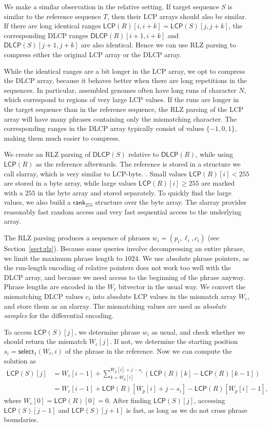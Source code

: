 \documentclass[a4paper,11pt]{llncs}
\newcommand{\set}[1]{\ensuremath{\{ #1 \}}}
\newcommand{\LCP}{\textsf{LCP}}
\newcommand{\DLCP}{\textsf{DLCP}}
\newcommand{\LCPbyte}{\textsf{LCP\nobreakdash-byte}}
\newcommand{\mLCP}{\ensuremath{\mathsf{LCP}}}
\newcommand{\mDLCP}{\ensuremath{\mathsf{DLCP}}}
\newcommand{\RLZ}{\textsf{RLZ}}
\newcommand{\slarray}{\textsf{slarray}}
\newcommand{\mrank}{\ensuremath{\mathsf{rank}}}
\newcommand{\mselect}{\ensuremath{\mathsf{select}}}
\begin{document}
We make a similar observation in the relative setting. If target sequence $S$
is similar to the reference sequence $T$, then their \LCP{} arrays should also
be similar. If there are long identical ranges $\mLCP(R)[i,i+k] =
\mLCP(S)[j,j+k]$, the corresponding \DLCP{} ranges $\mDLCP(R)[i+1,i+k]$ and
$\mDLCP(S)[j+1,j+k]$ are also identical. Hence we can use \RLZ{} parsing to
compress either the original \LCP{} array or the \DLCP{} array.

While the identical ranges are a bit longer in the \LCP{} array, we opt to
compress the \DLCP{} array, because it behaves better when there are long
repetitions in the sequences. In particular, assembled genomes often have long
runs of character $N$, which correspond to regions of very large \LCP{}
values. If the runs are longer in the target sequence than in the reference
sequence, the \RLZ{} parsing of the \LCP{} array will have many phrases
containing only the mismatching character. The corresponding ranges in the
\DLCP{} array typically consist of values $\set{-1, 0, 1}$, making them much
easier to compress.

We create an \RLZ{} parsing of $\mDLCP(S)$ relative to $\mDLCP(R)$, while
using $\mLCP(R)$ as the reference afterwards. The reference is stored in a
structure we call \slarray, which is very similar to \LCPbyte.
\cite{Abouelhoda2004}. Small values $\mLCP(R)[i] < 255$ are stored in a byte
array, while large values $\mLCP(R)[i] \ge 255$ are marked with a $255$ in the
byte array and stored separately. To quickly find the large values, we also
build a $\mrank_{255}$ structure over the byte array. The \slarray{} provides
reasonably fast random access and very fast sequential access to the
underlying array.

The \RLZ{} parsing produces a sequence of phrases $w_{i} = (p_{i}, \ell_{i},
c_{i})$ (see Section~\ref{sect:rlz}). Because some queries involve
decompressing an entire phrase, we limit the maximum phrase length to $1024$.
We use absolute phrase pointers, as the run-length encoding of relative
pointers does not work too well with the \DLCP{} array, and because we need
access to the beginning of the phrase anyway. Phrase lengths are encoded in
the $W_{\ell}$ bitvector in the usual way. We convert the mismatching \DLCP{}
values $c_{i}$ into absolute \LCP{} values in the mismatch array $W_{c}$, and
store them as an \slarray. The mismatching values are used as \emph{absolute
samples} for the differential encoding.

To access $\mLCP(S)[j]$, we determine phrase $w_{i}$ as usual, and check
whether we should return the mismatch $W_{c}[j]$. If not, we determine the
starting position $s_{i} = \mselect_{1}(W_{\ell}, i)$ of the phrase in the
reference. Now we can compute the solution as
\begin{align*}
\mLCP(S)[j] &= W_{c}[i-1] + \sum_{k = W_{p}[i]}^{W_{p}[i]+j-s_{i}}
(\mLCP(R)[k] - \mLCP(R)[k-1]) \\
&= W_{c}[i-1] + \mLCP(R)[W_{p}[i]+j-s_{i}] - \mLCP(R)[W_{p}[i]-1],
\end{align*}
where $W_{c}[0] = \mLCP(R)[0] = 0$. After finding $\mLCP(S)[j]$, accessing
$\mLCP(S)[j-1]$ and $\mLCP(S)[j+1]$ is fast, as long as we do not cross phrase
boundaries.
\end{document}

